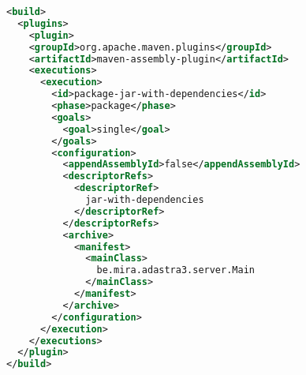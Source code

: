 \begin{lstlisting}[language=XML, float, caption=Gebruik van Maven modules om een executable te compileren., label=lst:fatjar]
<build>
  <plugins>
    <plugin>
    <groupId>org.apache.maven.plugins</groupId>
    <artifactId>maven-assembly-plugin</artifactId>
    <executions>
      <execution>
        <id>package-jar-with-dependencies</id>
        <phase>package</phase>
        <goals>
          <goal>single</goal>
        </goals>
        <configuration>
          <appendAssemblyId>false</appendAssemblyId>
          <descriptorRefs>
            <descriptorRef>
              jar-with-dependencies
            </descriptorRef>
          </descriptorRefs>
          <archive>
            <manifest>
              <mainClass>
                be.mira.adastra3.server.Main
              </mainClass>
            </manifest>
          </archive>
        </configuration>
      </execution>
    </executions>
  </plugin>
</build>
\end{lstlisting}

